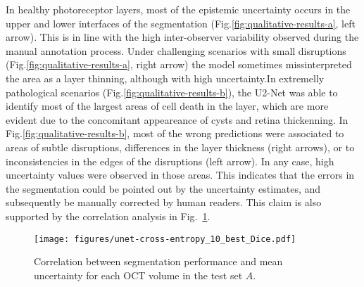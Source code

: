 In healthy photoreceptor layers, most of the epistemic uncertainty occurs in the upper and lower interfaces of the segmentation (Fig.\ref{fig:qualitative-results-a}, left arrow). This is in line with the high inter-observer variability observed during the manual annotation process. Under challenging scenarios with small disruptions (Fig.\ref{fig:qualitative-results-a}, right arrow) the model sometimes missinterpreted the area as a layer thinning, although with high uncertainty.In extremelly pathological scenarios (Fig.\ref{fig:qualitative-results-b}), the U2-Net was able to identify most of the largest areas of cell death in the layer, which are more evident due to the concomitant appeareance of cysts and retina thickenning. In Fig.\ref{fig:qualitative-results-b}, most of the wrong predictions were associated to areas of subtle disruptions, differences in the layer thickness (right arrows), or to inconsistencies in the edges of the disruptions (left arrow). In any case, high uncertainty values were observed in those areas. This indicates that the errors in the segmentation could be pointed out by the uncertainty estimates, and subsequently be manually corrected by human readers. This claim is also supported by the correlation analysis in Fig.~\ref{fig:uncertainty-volume}.

\begin{figure}[t]
 \centering
 \texttt{[image: figures/unet-cross-entropy\_10\_best\_Dice.pdf]}
 \caption{Correlation between segmentation performance and mean uncertainty for each OCT volume in the test set $A$.}
 \label{fig:uncertainty-volume}
\end{figure}
